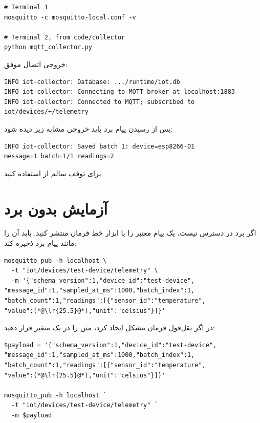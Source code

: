 \begin{LTR}
\begin{lstlisting}
# Terminal 1
mosquitto -c mosquitto-local.conf -v

# Terminal 2, from code/collector
python mqtt_collector.py
\end{lstlisting}
\end{LTR}

خروجی اتصال موفق:

\begin{LTR}
\begin{lstlisting}
INFO iot-collector: Database: .../runtime/iot.db
INFO iot-collector: Connecting to MQTT broker at localhost:1883
INFO iot-collector: Connected to MQTT; subscribed to iot/devices/+/telemetry
\end{lstlisting}
\end{LTR}

پس از رسیدن پیام برد باید خروجی مشابه زیر دیده شود:

\begin{LTR}
\begin{lstlisting}
INFO iot-collector: Saved batch 1: device=esp8266-01
message=1 batch=1/1 readings=2
\end{lstlisting}
\end{LTR}

برای توقف سالم از
استفاده کنید.

\section{آزمایش بدون برد}
اگر برد در دسترس نیست، یک پیام معتبر را با ابزار خط فرمان منتشر کنید.
باید آن را مانند پیام برد ذخیره کند:

\begin{LTR}
\begin{lstlisting}
mosquitto_pub -h localhost \
  -t "iot/devices/test-device/telemetry" \
  -m '{"schema_version":1,"device_id":"test-device",
"message_id":1,"sampled_at_ms":1000,"batch_index":1,
"batch_count":1,"readings":[{"sensor_id":"temperature",
"value":(*@\lr{25.5}@*),"unit":"celsius"}]}'
\end{lstlisting}
\end{LTR}

در
اگر نقل‌قول فرمان مشکل ایجاد کرد، متن
را در یک متغیر قرار دهید:

\begin{LTR}
\begin{lstlisting}
$payload = '{"schema_version":1,"device_id":"test-device",
"message_id":1,"sampled_at_ms":1000,"batch_index":1,
"batch_count":1,"readings":[{"sensor_id":"temperature",
"value":(*@\lr{25.5}@*),"unit":"celsius"}]}'

mosquitto_pub -h localhost `
  -t "iot/devices/test-device/telemetry" `
  -m $payload
\end{lstlisting}
\end{LTR}

